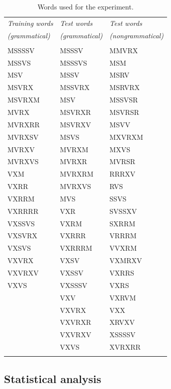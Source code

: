 \begin{table}[h]
\centering
\begin{tabular}{| p{3.5cm} | p{3.5cm} | p{3.5cm} |}
\hline
\textit{Training words} & \textit{Test words} & \textit{Test words}\\
\textit{(grammatical)} & \textit{(grammatical)} & \textit{(nongrammatical)} \\
\hline
& & \\
MSSSSV & MSSSV & MMVRX \\
MSSVS & MSSSVS & MSM \\
MSV & MSSV & MSRV \\
MSVRX & MSSVRX & MSRVRX \\ 
MSVRXM & MSV & MSSVSR \\
MVRX & MSVRXR & MSVRSR \\
MVRXRR & MSVRXV & MSVV \\
MVRXSV & MSVS & MXVRXM \\
MVRXV & MVRXM & MXVS \\
MVRXVS & MVRXR & MVRSR \\
VXM & MVRXRM & RRRXV \\
VXRR & MVRXVS & RVS \\
VXRRM & MVS & SSVS \\
VXRRRR & VXR & SVSSXV \\
VXSSVS & VXRM & SXRRM \\
VXSVRX & VXRRR & VRRRM \\
VXSVS & VXRRRM & VVXRM \\
VXVRX & VXSV & VXMRXV \\
VXVRXV & VXSSV & VXRRS \\
VXVS & VXSSSV & VXRS \\
          & VXV & VXRVM \\
         & VXVRX & VXX \\
          & VXVRXR & XRVXV \\
            & VXVRXV & XSSSSV \\
            & VXVS & XVRXRR \\
& & \\
\hline
\end{tabular}
\caption{Words used for the experiment.}
\label{tab:stimuli}
\end{table}


\subsection{Statistical analysis}


